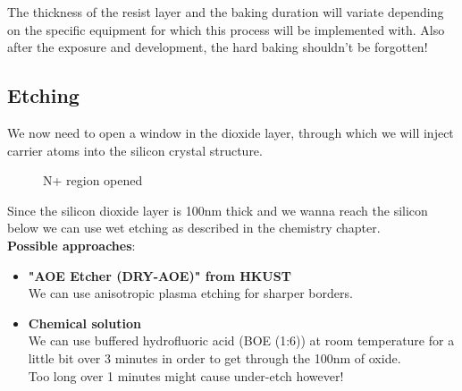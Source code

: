 The thickness of the resist layer and the baking duration will variate depending on the specific equipment for which this process will be implemented with.
Also after the exposure and development, the hard baking shouldn't be forgotten!

\subsection{Etching}

We now need to open a window in the dioxide layer, through which we will inject carrier atoms into the silicon crystal structure.

\begin{figure}[H]
	\centering
	\begin{tikzpicture}[node distance = 3cm, auto, thick,scale=\CrossAndTopSection, every node/.style={transform shape}]
		
	\end{tikzpicture}
	\begin{tikzpicture}[node distance = 3cm, auto, thick,scale=\CrossAndTopSection, every node/.style={transform shape}]
		
	\end{tikzpicture}
	\drawStepArrow{}
	\begin{tikzpicture}[node distance = 3cm, auto, thick,scale=\CrossAndTopSection, every node/.style={transform shape}]
		
	\end{tikzpicture}
	\begin{tikzpicture}[node distance = 3cm, auto, thick,scale=\CrossAndTopSection, every node/.style={transform shape}]
		
	\end{tikzpicture}
	\caption{N+ region opened}
\end{figure}

Since the silicon dioxide layer is 100nm thick and we wanna reach the silicon below we can use wet etching as described in the chemistry chapter.\\

\textbf{Possible approaches}:
\begin{itemize}
	\item \textbf{"AOE Etcher (DRY-AOE)" from HKUST} \\
	We can use anisotropic plasma etching for sharper borders.
	\item \textbf{Chemical solution} \\
	We can use buffered hydrofluoric acid (BOE (1:6)) at room temperature for a little bit over 3 minutes in order to get through the 100nm of oxide.\\
	Too long over 1 minutes might cause under-etch however!
\end{itemize}

